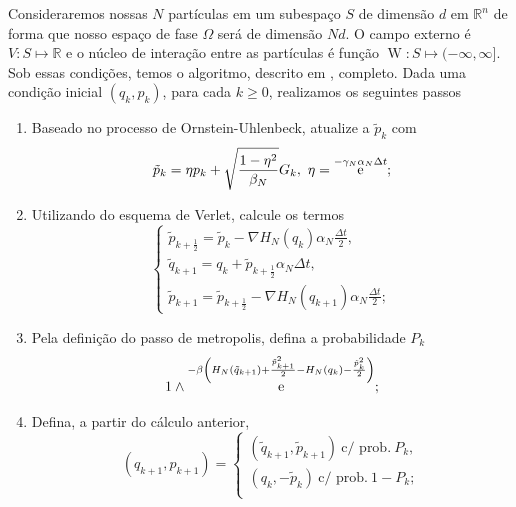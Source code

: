 \documentclass[11pt,twocolumn]{article}
\DeclareMathOperator{\W}{W}
\DeclareMathOperator{\ee}{\textrm e}
\newcommand{\p}{p} %
\numberwithin{equation}{section} %
\begin{document}
 Consideraremos nossas $N$ partículas em um subespaço $S$ de dimensão $d$ em $\mathbb{R}^n$ de forma que nosso espaço de fase $\Omega$ será de dimensão $Nd$. O campo externo é $V : S \mapsto \mathbb{R}$ e o núcleo de interação entre as partículas é função $\W : S \mapsto (-\infty, \infty]$. Sob essas condições, temos o algoritmo, descrito em \cite{Chafa2018}, completo. Dada uma condição inicial $(q_k, p_k)$, para cada $k\geq0$, realizamos os seguintes passos
\begin{enumerate}
	\item Baseado no processo de Ornstein-Uhlenbeck, atualize a $\tilde{\p}_k$ com
	\begin{equation}
		\tilde{p}_k = \eta p_k + \sqrt{\frac{1-\eta^2}{\beta_N}} G_k, \ \eta = \ee^{-\gamma_N \alpha_N \Delta t};
		\label{Equation: Alg Mehler}
	\end{equation}
	\item Utilizando do esquema de Verlet, calcule os termos
	\begin{equation}
		\begin{cases}
			\tilde{p}_{k+\frac{1}{2}} = \tilde{p}_k - \nabla H_N(q_k) \alpha_N \frac{\Delta t}{2}, \\
			\tilde{q}_{k+1} = q_k + \tilde{p}_{k + \frac{1}{2}} \alpha_N \Delta t, \\
			\tilde{p}_{k+1} = \tilde{p}_{k+\frac{1}{2}} - \nabla H_N(q_{k+1}) \alpha_N \frac{\Delta t}{2};
			\label{Equation: Alg Verlet}
		\end{cases}
	\end{equation}
	\item Pela definição do passo de metropolis, defina a probabilidade $P_k$
	\begin{equation}
		1 \wedge \ee^{ -\beta \left( H_N(\tilde{q}_{k+1}) + \frac{\tilde{p}^2_{k+1}}{2} - H_N(q_k) - \frac{\tilde{p}^2_k}{2} \right) };
		\label{Equação: Alg Pk}
	\end{equation}
	\item Defina, a partir do cálculo anterior, 
	\begin{equation}
		(q_{k+1}, p_{k+1}) = 
		\begin{cases}
			(\tilde{q}_{k+1}, \tilde{p}_{k+1}) \ \text{c/ prob.} \ P_k, \\
			(q_k, -\tilde{p}_{k}) \ \text{c/ prob.} \ 1-P_k; \\
		\end{cases}
		\label{Equation: Alg Metro}
	\end{equation}
\end{enumerate}
\end{document}
